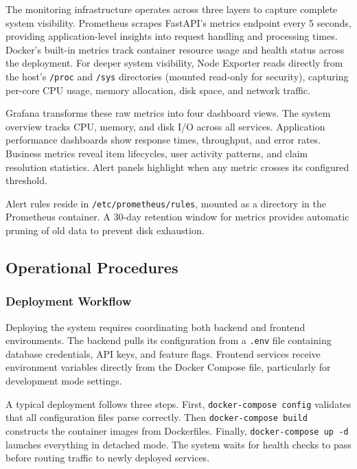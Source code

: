 The monitoring infrastructure operates across three layers to capture complete system visibility. Prometheus scrapes FastAPI's metrics endpoint every 5 seconds, providing application-level insights into request handling and processing times. Docker's built-in metrics track container resource usage and health status across the deployment. For deeper system visibility, Node Exporter reads directly from the host's \texttt{/proc} and \texttt{/sys} directories (mounted read-only for security), capturing per-core CPU usage, memory allocation, disk space, and network traffic.

Grafana transforms these raw metrics into four dashboard views. The system overview tracks CPU, memory, and disk I/O across all services. Application performance dashboards show response times, throughput, and error rates. Business metrics reveal item lifecycles, user activity patterns, and claim resolution statistics. Alert panels highlight when any metric crosses its configured threshold.

Alert rules reside in \texttt{/etc/prometheus/rules}, mounted as a directory in the Prometheus container. A 30-day retention window for metrics provides automatic pruning of old data to prevent disk exhaustion.

\subsection{Operational Procedures} \label{subsection:operational_procedures}

\subsubsection{Deployment Workflow}

Deploying the system requires coordinating both backend and frontend environments. The backend pulls its configuration from a \texttt{.env} file containing database credentials, API keys, and feature flags. Frontend services receive environment variables directly from the Docker Compose file, particularly for development mode settings.

A typical deployment follows three steps. First, \texttt{docker-compose config} validates that all configuration files parse correctly. Then \texttt{docker-compose build} constructs the container images from Dockerfiles. Finally, \texttt{docker-compose up -d} launches everything in detached mode. The system waits for health checks to pass before routing traffic to newly deployed services.

